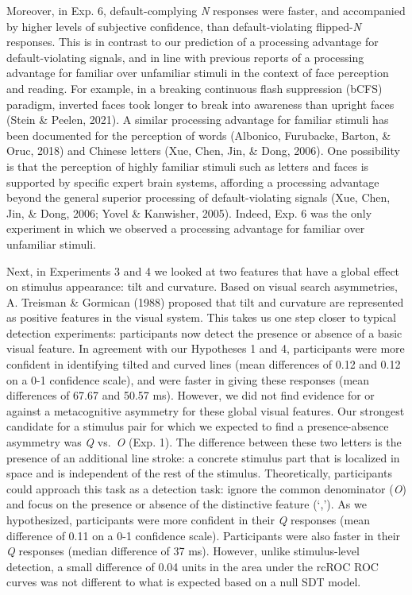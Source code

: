 \documentclass[12pt,twoside]{reedthesis}
\begin{document}
Moreover, in Exp. 6, default-complying \emph{N} responses were faster, and accompanied by higher levels of subjective confidence, than default-violating flipped-\emph{N} responses. This is in contrast to our prediction of a processing advantage for default-violating signals, and in line with previous reports of a processing advantage for familiar over unfamiliar stimuli in the context of face perception and reading. For example, in a breaking continuous flash suppression (bCFS) paradigm, inverted faces took longer to break into awareness than upright faces (Stein \& Peelen, 2021). A similar processing advantage for familiar stimuli has been documented for the perception of words (Albonico, Furubacke, Barton, \& Oruc, 2018) and Chinese letters (Xue, Chen, Jin, \& Dong, 2006). One possibility is that the perception of highly familiar stimuli such as letters and faces is supported by specific expert brain systems, affording a processing advantage beyond the general superior processing of default-violating signals (Xue, Chen, Jin, \& Dong, 2006; Yovel \& Kanwisher, 2005). Indeed, Exp. 6 was the only experiment in which we observed a processing advantage for familiar over unfamiliar stimuli.

Next, in Experiments 3 and 4 we looked at two features that have a global effect on stimulus appearance: tilt and curvature. Based on visual search asymmetries, A. Treisman \& Gormican (1988) proposed that tilt and curvature are represented as positive features in the visual system. This takes us one step closer to typical detection experiments: participants now detect the presence or absence of a basic visual feature. In agreement with our Hypotheses 1 and 4, participants were more confident in identifying tilted and curved lines (mean differences of 0.12 and 0.12 on a 0-1 confidence scale), and were faster in giving these responses (mean differences of 67.67 and 50.57 ms). However, we did not find evidence for or against a metacognitive asymmetry for these global visual features.
Our strongest candidate for a stimulus pair for which we expected to find a presence-absence asymmetry was \emph{Q} vs.~\emph{O} (Exp. 1). The difference between these two letters is the presence of an additional line stroke: a concrete stimulus part that is localized in space and is independent of the rest of the stimulus. Theoretically, participants could approach this task as a detection task: ignore the common denominator (\emph{O}) and focus on the presence or absence of the distinctive feature (`,'). As we hypothesized, participants were more confident in their \emph{Q} responses (mean difference of 0.11 on a 0-1 confidence scale). Participants were also faster in their \emph{Q} responses (median difference of 37 ms). However, unlike stimulus-level detection, a small difference of 0.04 units in the area under the rcROC ROC curves was not different to what is expected based on a null SDT model.
\end{document}
